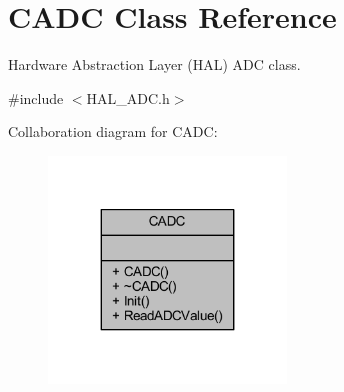 \hypertarget{class_c_a_d_c}{}\section{C\+A\+DC Class Reference}
\label{class_c_a_d_c}


Hardware Abstraction Layer (H\+AL) A\+DC class.  




{\ttfamily \#include $<$H\+A\+L\+\_\+\+A\+D\+C.\+h$>$}



Collaboration diagram for C\+A\+DC\+:\nopagebreak
\begin{figure}[H]
\begin{center}
\leavevmode
\includegraphics[width=179pt]{class_c_a_d_c__coll__graph}
\end{center}
\end{figure}
